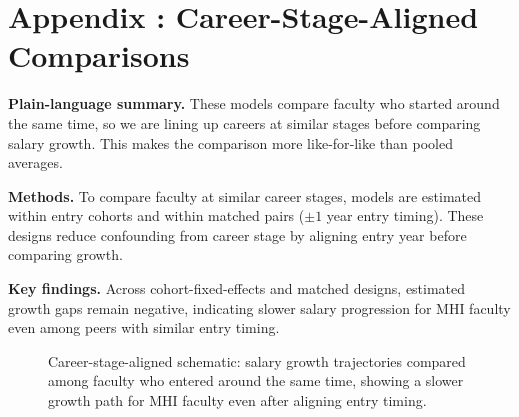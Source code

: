 \documentclass{article}
\begin{document}
\clearpage
{}
\section*{Appendix \thesection: Career-Stage-Aligned Comparisons}
\label{app:career_stage_aligned}

\textbf{Plain-language summary.} These models compare faculty who started around the same time, so we are lining up careers at similar stages before comparing salary growth. This makes the comparison more like‑for‑like than pooled averages.

\textbf{Methods.} To compare faculty at similar career stages, models are estimated within entry cohorts and within matched pairs (\(\pm 1\) year entry timing). These designs reduce confounding from career stage by aligning entry year before comparing growth.

\textbf{Key findings.} Across cohort-fixed-effects and matched designs, estimated growth gaps remain negative, indicating slower salary progression for MHI faculty even among peers with similar entry timing.

\begin{figure}[h]
    \centering
    \caption{Career-stage-aligned schematic: salary growth trajectories compared among faculty who entered around the same time, showing a slower growth path for MHI faculty even after aligning entry timing.}
\end{figure}
\end{document}
